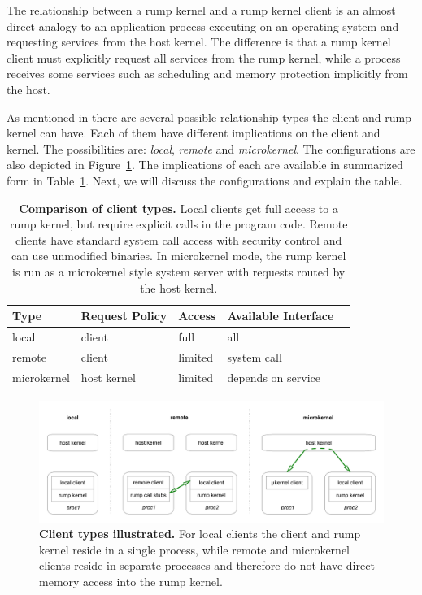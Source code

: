 The relationship between a rump kernel and a rump kernel client is
an almost direct analogy to an application process executing on an
operating system and requesting services from the host kernel.
The difference is that a rump kernel client must explicitly request
all services from the rump kernel, while a process receives some
services such as scheduling and memory protection implicitly from
the host.

As mentioned in  there are several possible relationship
types the client and rump kernel can have.  Each of them have
different implications on the client and kernel.  The possibilities
are: \textit{local}, \textit{remote} and \textit{microkernel}.
The configurations are also depicted in Figure~\ref{fig:clidiag}.
The implications of each are available in summarized form in
Table~\ref{tab:clients}.  Next, we will discuss the configurations and
explain the table.

\begin{table}[t]
\begin{tabular}{| l | l | l | l | l |}
\hline
Type & Request Policy & Access & Available Interface \\
\hline
\hline
local & client & full & all \\
\hline
remote & client & limited & system call \\
\hline
microkernel & host kernel & limited & depends on service \\
\hline
\end{tabular}
\caption[Comparison of client types]{\textbf{Comparison of client types.}
Local clients get full access to a rump kernel, but require explicit
calls in the program code.  Remote clients have standard system
call access with security control and can use unmodified binaries.
In microkernel mode, the rump kernel is run as a microkernel style system
server with requests routed by the host kernel.
}
\label{tab:clients}
\end{table}

\begin{figure}[t]
\includegraphics[width=\linewidth]{clientcomp}
\caption[Client types illustrated]{\textbf{Client types illustrated.}
For local clients the client and rump kernel reside in a single process,
while remote and microkernel clients reside in separate processes and
therefore do not have direct memory access into the rump kernel.
}
\label{fig:clidiag}
\end{figure}

